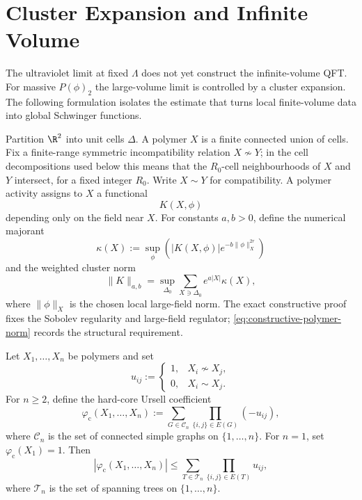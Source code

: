 \section{Cluster Expansion and Infinite Volume}

The ultraviolet limit at fixed \(\Lambda\) does not yet construct the
infinite-volume QFT.  For massive \(P(\phi)_2\) the large-volume limit is
controlled by a cluster expansion.  The following formulation isolates the
estimate that turns local finite-volume data into global Schwinger functions.

\begin{definition}
\label{def:constructive-polymer-activity}
Partition \(\R^2\) into unit cells \(\Delta\).  A polymer \(X\) is a finite
connected union of cells.  Fix a finite-range symmetric incompatibility
relation \(X\nsim Y\); in the cell decompositions used below this means that
the \(R_0\)-cell neighbourhoods of \(X\) and \(Y\) intersect, for a fixed
integer \(R_0\).  Write \(X\sim Y\) for compatibility.  A polymer activity
assigns to \(X\) a functional
\[
  K(X,\phi)
\]
depending only on the field near \(X\).  For constants \(a,b>0\), define the
numerical majorant
\begin{equation}
  \kappa(X)
  :=
  \sup_{\phi}
  \left(
    |K(X,\phi)|e^{-b\|\phi\|_{X}^{2r}}
  \right)
  \label{eq:constructive-polymer-majorant}
\end{equation}
and the
weighted cluster norm
\begin{equation}
  \|K\|_{a,b}
  =
  \sup_{\Delta_0}
  \sum_{X\ni\Delta_0}
  e^{a|X|}
  \kappa(X),
  \label{eq:constructive-polymer-norm}
\end{equation}
where \(\|\phi\|_X\) is the chosen local large-field norm.  The exact
constructive proof fixes the Sobolev regularity and large-field regulator;
\eqref{eq:constructive-polymer-norm} records the structural requirement.
\end{definition}

\begin{lemma}
\label{lem:constructive-penrose-tree-graph-bound}
Let \(X_1,\ldots,X_n\) be polymers and set
\[
  u_{ij}:=
  \begin{cases}
    1,& X_i\nsim X_j,\\
    0,& X_i\sim X_j .
  \end{cases}
\]
For \(n\geq2\), define the hard-core Ursell coefficient
\begin{equation}
  \varphi_{\mathrm c}(X_1,\ldots,X_n)
  :=
  \sum_{G\in\mathcal C_n}
  \prod_{\{i,j\}\in E(G)}(-u_{ij}),
  \label{eq:constructive-ursell-coefficient}
\end{equation}
where \(\mathcal C_n\) is the set of connected simple graphs on
\(\{1,\ldots,n\}\).  For \(n=1\), set \(\varphi_{\mathrm c}(X_1)=1\).
Then
\begin{equation}
  |\varphi_{\mathrm c}(X_1,\ldots,X_n)|
  \leq
  \sum_{T\in\mathcal T_n}
  \prod_{\{i,j\}\in E(T)}u_{ij},
  \label{eq:constructive-tree-graph-inequality}
\end{equation}
where \(\mathcal T_n\) is the set of spanning trees on
\(\{1,\ldots,n\}\).
\end{lemma}

